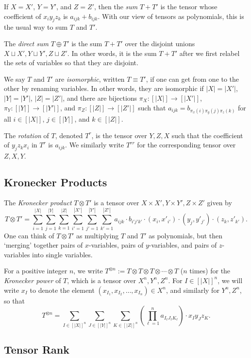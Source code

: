 \documentclass{theoretics}
\begin{document}
If $X=X'$, $Y=Y'$, and $Z=Z'$, then the \emph{sum} $T+T'$ is the tensor whose coefficient of $x_iy_jz_k$ is $a_{ijk} + b_{ijk}$. With our view of tensors as polynomials, this is the usual way to sum $T$ and $T'$.

The \emph{direct sum} $T \oplus T'$ is the sum $T+T'$ over the disjoint unions $X \sqcup X', Y \sqcup Y', Z \sqcup Z'$. In other words, it is the sum $T+T'$ after we first relabel the sets of variables so that they are disjoint.

We say $T$ and $T'$ are \emph{isomorphic}, written $T \equiv T'$, if one can get from one to the other by renaming variables. In other words, they are isomorphic if $|X|=|X'|$, $|Y|=|Y'|$, $|Z|=|Z'|$, and there are bijections $\pi_X : [|X|] \to [|X'|]$, $\pi_Y : [|Y|] \to [|Y'|]$, and $\pi_Z : [|Z|] \to [|Z'|]$ such that $a_{ijk} = b_{\pi_x(i) \pi_y(j) \pi_z(k)}$ for all $i \in [|X|]$, $j \in [|Y|]$, and $k \in [|Z|]$.

The \emph{rotation} of $T$, denoted $T^r$, is the tensor over $Y,Z,X$ such that the coefficient of $y_jz_kx_i$ in $T^r$ is $a_{ijk}$. We similarly write $T^{rr}$ for the corresponding tensor over $Z,X,Y$.

\subsection{Kronecker Products}

The \emph{Kronecker product} $T \otimes T'$ is a tensor over $X \times X', Y \times Y', Z \times Z'$ given by
$$T \otimes T' = \sum_{i=1}^{|X|} \sum_{j=1}^{|Y|} \sum_{k=1}^{|Z|} \sum_{i'=1}^{|X'|} \sum_{j'=1}^{|Y'|} \sum_{k'=1}^{|Z'|} a_{ijk} \cdot b_{i'j'k'} \cdot (x_i,x'_{i'}) \cdot (y_j,y'_{j'}) \cdot (z_k,z'_{k'}).$$ One can think of $T \otimes T'$ as multiplying $T$ and $T'$ as polynomials, but then `merging' together pairs of $x$-variables, pairs of $y$-variables, and pairs of $z$-variables into single variables.

For a positive integer $n$, we write $T^{\otimes n} := T \otimes T \otimes T \otimes \cdots \otimes T$ ($n$ times) for the \emph{Kronecker power} of $T$, which is a tensor over $X^n, Y^n, Z^n$. For $I \in [|X|]^n$, we will write $x_I$ to denote the element $(x_{I_1}, x_{I_2}, \ldots, x_{I_n}) \in X^n$, and similarly for $Y^n,Z^n$, so that
$$T^{\otimes n} = \sum_{I \in [|X|]^n} \sum_{J \in [|Y|]^n} \sum_{K \in [|Z|]^n} \left( \prod_{\ell=1}^n a_{I_\ell J_\ell K_\ell}  \right) \cdot x_I  y_J  z_K.$$

\subsection{Tensor Rank}
\end{document}
